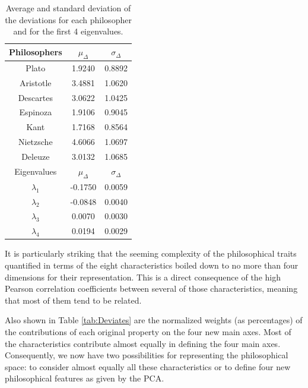 \documentclass[%
 aip,
 jmp,%
 amsmath,amssymb,
 reprint,%
]{revtex4-1}
\begin{document}
\begin{table}%
\caption{\label{tab:tableD}Average and standard deviation of the 
deviations for each philosopher and for the first 
4 eigenvalues.  }

\begin{tabular}{|c||c|c|}
\hline

Philosophers & $\mu_{\Delta}$ & $\sigma_{\Delta}$ \\
\hline
Plato          & 1.9240 & 0.8892 \\
Aristotle      & 3.4881 & 1.0620 \\
Descartes      & 3.0622 & 1.0425 \\
Espinoza       & 1.9106 & 0.9045 \\
Kant           & 1.7168 & 0.8564 \\
Nietzsche      & 4.6066 & 1.0697 \\
Deleuze        & 3.0132 & 1.0685 \\
\hline \hline
Eigenvalues & $\mu_{\Delta}$ & $\sigma_{\Delta}$ \\
\hline
$\lambda_1$ & -0.1750 & 0.0059 \\
$\lambda_2$ & -0.0848 & 0.0040 \\
$\lambda_3$ &  0.0070 & 0.0030 \\
$\lambda_4$ &  0.0194 & 0.0029 \\
\hline

\end{tabular}
\end{table}

It is particularly striking that the seeming complexity of the
philosophical traits quantified in terms of the eight characteristics
boiled down to no more than four dimensions for their representation.
This is a direct consequence of the high Pearson correlation
coefficients between several of those characteristics, meaning that
most of them tend to be related.

Also shown in Table \ref{tab:Deviates} are the normalized weights (as
percentages) of the contributions of each original property on the four
new main axes.  Most of the characteristics contribute almost equally
in defining the four main axes.  Consequently, we now have two
possibilities for representing the philosophical space: to consider
almost equally all these characteristics or to define four new
philosophical features as given by the PCA.
\end{document}
